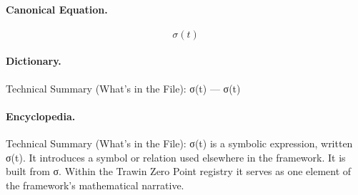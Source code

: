 \paragraph{Canonical Equation.}
\[
\sigma(t)
\]

\paragraph{Dictionary.}
Technical Summary (What’s in the File): σ(t) — σ(t)

\paragraph{Encyclopedia.}
Technical Summary (What’s in the File): σ(t) is a symbolic expression, written σ(t). It introduces a symbol or relation used elsewhere in the framework. It is built from σ. Within the Trawin Zero Point registry it serves as one element of the framework's mathematical narrative.
